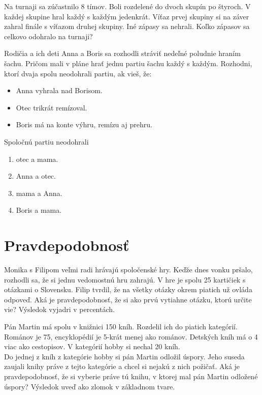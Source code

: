 \begin{example}
	Na turnaji sa zúčastnilo 8 tímov. Boli rozdelené do dvoch skupín po štyroch. V každej skupine hral každý s každým jedenkrát. Víťaz prvej skupiny si na záver zahral finále s víťazom druhej skupiny. Iné zápasy sa nehrali. Koľko zápasov sa celkovo odohralo na turnaji?
\end{example}

\begin{example}
	Rodičia a ich deti Anna a Boris sa rozhodli stráviť nedeľné poludnie hraním šachu. Pričom mali v pláne hrať jednu partiu šachu každý s každým. Rozhodni, ktorí dvaja spolu neodohrali partiu, ak vieš, že:
	\begin{itemize}
		\item Anna vyhrala nad Borisom.
		\item Otec trikrát remízoval.
		\item Boris má na konte výhru, remízu aj prehru.
	\end{itemize}
	
	Spoločnú partiu neodohrali
	
	\begin{enumerate}
		\item otec a mama.
		\item Anna a otec.
		\item mama a Anna.
		\item Boris a mama.
	\end{enumerate}
\end{example}

\section{Pravdepodobnosť}

\begin{example}
	Monika s Filipom veľmi radi hrávajú spoločenské hry. Keďže dnes vonku pršalo, rozhodli sa, že si jednu vedomostnú hru zahrajú. V hre je spolu 25 kartičiek s otázkami o Slovensku. Filip tvrdil, že na všetky otázky okrem piatich už ovláda odpoveď. Aká je pravdepodobnosť, že si ako prvú vytiahne otázku, ktorú určite vie? Výsledok vyjadri v percentách.
\end{example}

\begin{example}
	Pán Martin má spolu v knižnici 150 kníh. Rozdelil ich do piatich kategórií. Románov je 75, encyklopédií je 5-krát menej ako románov. Detských kníh má o 4 viac ako cestopisov. V kategórií hobby si nechal 20 kníh. \\
	
	Do jednej z kníh z kategórie hobby si pán Martin odložil úspory. Jeho suseda zaujali knihy práve z tejto kategórie a chcel si nejakú z nich požičať. Aká je pravdepodobnosť, že si vyberie práve tú knihu, v ktorej mal pán Martin odložené úspory? Výsledok uveď ako zlomok v základnom tvare.
\end{example}


